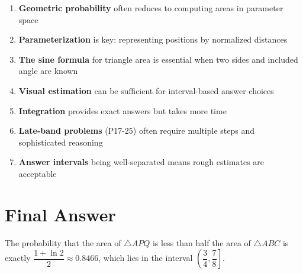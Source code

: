 \documentclass[11pt]{article}
\begin{document}
\begin{enumerate}
    \item \textbf{Geometric probability} often reduces to computing areas in parameter space
    \item \textbf{Parameterization} is key: representing positions by normalized distances
    \item \textbf{The sine formula} for triangle area is essential when two sides and included angle are known
    \item \textbf{Visual estimation} can be sufficient for interval-based answer choices
    \item \textbf{Integration} provides exact answers but takes more time
    \item \textbf{Late-band problems} (P17-25) often require multiple steps and sophisticated reasoning
    \item \textbf{Answer intervals} being well-separated means rough estimates are acceptable
\end{enumerate}

\section*{Final Answer}

The probability that the area of $\triangle APQ$ is less than half the area of $\triangle ABC$ is exactly $\dfrac{1 + \ln 2}{2} \approx 0.8466$, which lies in the interval $\left(\dfrac{3}{4}, \dfrac{7}{8}\right]$.

\begin{center}
\fbox{\Large \textbf{Answer: (D) } $\left(\dfrac{3}{4}, \dfrac{7}{8}\right]$}
\end{center}
\end{document}
